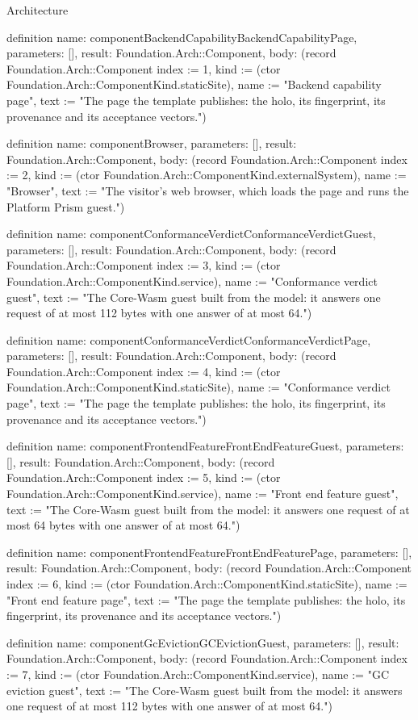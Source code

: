 \begin{lexlean}{Architecture}
\begin{semanticmodule}
definition{
  name: componentBackendCapabilityBackendCapabilityPage,
  parameters: [],
  result: Foundation.Arch::Component,
  body: (record Foundation.Arch::Component {index := 1, kind := (ctor Foundation.Arch::ComponentKind.staticSite), name := "Backend capability page", text := "The page the template publishes: the holo, its fingerprint, its provenance and its acceptance vectors."})
}

definition{
  name: componentBrowser,
  parameters: [],
  result: Foundation.Arch::Component,
  body: (record Foundation.Arch::Component {index := 2, kind := (ctor Foundation.Arch::ComponentKind.externalSystem), name := "Browser", text := "The visitor's web browser, which loads the page and runs the Platform Prism guest."})
}

definition{
  name: componentConformanceVerdictConformanceVerdictGuest,
  parameters: [],
  result: Foundation.Arch::Component,
  body: (record Foundation.Arch::Component {index := 3, kind := (ctor Foundation.Arch::ComponentKind.service), name := "Conformance verdict guest", text := "The Core-Wasm guest built from the model: it answers one request of at most 112 bytes with one answer of at most 64."})
}

definition{
  name: componentConformanceVerdictConformanceVerdictPage,
  parameters: [],
  result: Foundation.Arch::Component,
  body: (record Foundation.Arch::Component {index := 4, kind := (ctor Foundation.Arch::ComponentKind.staticSite), name := "Conformance verdict page", text := "The page the template publishes: the holo, its fingerprint, its provenance and its acceptance vectors."})
}

definition{
  name: componentFrontendFeatureFrontEndFeatureGuest,
  parameters: [],
  result: Foundation.Arch::Component,
  body: (record Foundation.Arch::Component {index := 5, kind := (ctor Foundation.Arch::ComponentKind.service), name := "Front end feature guest", text := "The Core-Wasm guest built from the model: it answers one request of at most 64 bytes with one answer of at most 64."})
}

definition{
  name: componentFrontendFeatureFrontEndFeaturePage,
  parameters: [],
  result: Foundation.Arch::Component,
  body: (record Foundation.Arch::Component {index := 6, kind := (ctor Foundation.Arch::ComponentKind.staticSite), name := "Front end feature page", text := "The page the template publishes: the holo, its fingerprint, its provenance and its acceptance vectors."})
}

definition{
  name: componentGcEvictionGCEvictionGuest,
  parameters: [],
  result: Foundation.Arch::Component,
  body: (record Foundation.Arch::Component {index := 7, kind := (ctor Foundation.Arch::ComponentKind.service), name := "GC eviction guest", text := "The Core-Wasm guest built from the model: it answers one request of at most 112 bytes with one answer of at most 64."})
}


\end{semanticmodule}
\end{lexlean}
